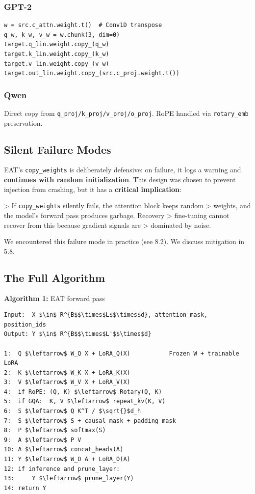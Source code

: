 \subsubsection{GPT-2}

\begin{lstlisting}
w = src.c_attn.weight.t()  # Conv1D transpose
q_w, k_w, v_w = w.chunk(3, dim=0)
target.q_lin.weight.copy_(q_w)
target.k_lin.weight.copy_(k_w)
target.v_lin.weight.copy_(v_w)
target.out_lin.weight.copy_(src.c_proj.weight.t())
\end{lstlisting}

\subsubsection{Qwen}

Direct copy from \texttt{q\_proj/k\_proj/v\_proj/o\_proj}. RoPE handled via \texttt{rotary\_emb} 
preservation.

\subsection{Silent Failure Modes}

EAT's \texttt{copy\_weights} is deliberately defensive: on failure, it logs a 
warning and \textbf{continues with random initialization}. This design was chosen 
to prevent injection from crashing, but it has a \textbf{critical implication}:

> If \texttt{copy\_weights} silently fails, the attention block keeps random 
> weights, and the model's forward pass produces garbage. Recovery 
> fine-tuning cannot recover from this because gradient signals are 
> dominated by noise.

We encountered this failure mode in practice (see  8.2). We discuss 
mitigation in  5.8.

\subsection{The Full Algorithm}

\textbf{Algorithm 1:} EAT forward pass
\begin{lstlisting}
Input:  X $\in$ R^{B$$\times$L$$\times$d}, attention_mask, position_ids
Output: Y $\in$ R^{B$$\times$L'$$\times$d}

1:  Q $\leftarrow$ W_Q X + LoRA_Q(X)           Frozen W + trainable LoRA
2:  K $\leftarrow$ W_K X + LoRA_K(X)
3:  V $\leftarrow$ W_V X + LoRA_V(X)
4:  if RoPE: (Q, K) $\leftarrow$ Rotary(Q, K)
5:  if GQA:  K, V $\leftarrow$ repeat_kv(K, V)
6:  S $\leftarrow$ Q K^T / $\sqrt{}$d_h
7:  S $\leftarrow$ S + causal_mask + padding_mask
8:  P $\leftarrow$ softmax(S)
9:  A $\leftarrow$ P V
10: A $\leftarrow$ concat_heads(A)
11: Y $\leftarrow$ W_O A + LoRA_O(A)
12: if inference and prune_layer:
13:     Y $\leftarrow$ prune_layer(Y)
14: return Y
\end{lstlisting}

